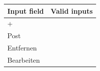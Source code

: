 \documentclass[12pt]{article}
\theoremstyle{definition}
\begin{document}
\begin{figure}[!h]
\begin{floatrow}
           \end{floatrow}
        \end{figure}
        
\begin{tabular}{|l|l|}
\hline
Input field & Valid inputs \\ \hline
 + &  \\ \hline
 Post &  \\ \hline
 Entfernen &  \\ \hline
 Bearbeiten &  \\ \hline
\end{tabular}
\end{document}
